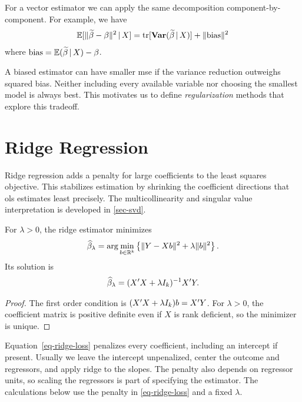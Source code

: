\documentclass[a4paper,12pt]{article}
\begin{document}
\begin{remark}
	For a vector estimator we can apply the same decomposition component-by-component.
	For example, we have
	\begin{align*}
		\operatorname{\mathbb{E}}[\|\widetilde\beta-\beta\|^2\mathpunct{}|\mathpunct{} X]
		=\operatorname{tr}[\operatorname{\text{\textrm{\upshape\textbf{Var}}}}(\widetilde\beta\mathpunct{}|\mathpunct{} X)]+\|\text{bias}\|^2
	\end{align*}
	where $\text{bias}=\operatorname{\mathbb{E}}(\widetilde\beta\mathpunct{}|\mathpunct{} X)-\beta$.
\end{remark}

\begin{remark}
	A biased estimator can have smaller \gls{mse} if the variance reduction outweighs squared bias.
	Neither including every available variable nor choosing the smallest model is always best.
	This motivates us to define \emph{regularization} methods that explore this tradeoff.
\end{remark}

\section{Ridge Regression}

Ridge regression adds a penalty for large coefficients to the least squares objective.
This stabilizes estimation by shrinking the coefficient directions that \gls{ols} estimates least precisely.
The multicollinearity and singular value interpretation is developed in \autoref{sec-svd}.

\begin{definition}
	For $\lambda>0$, the ridge estimator minimizes
	\begin{align}\label{eq-ridge-loss}
		\widehat\beta_\lambda
		=\arg\min_{b\in\mathbb{R}^k}
		\left\{\|Y-Xb\|^2+\lambda\|b\|^2\right\}.
	\end{align}
	Its solution is
	\begin{align}\label{eq-ridge-solution}
		\widehat\beta_\lambda=(X^{\prime} X+\lambda I_k)^{-1} X^{\prime} Y.
	\end{align}
\end{definition}
\begin{proof}
	The first order condition is $(X^{\prime} X+\lambda I_k)b=X^{\prime} Y$.
	For $\lambda>0$, the coefficient matrix is positive definite even if $X$ is rank deficient,
	so the minimizer is unique.
\end{proof}

\begin{remark}
	Equation~\eqref{eq-ridge-loss} penalizes every coefficient, including an intercept if present.
	Usually we leave the intercept unpenalized, center the outcome and regressors, and apply ridge to the slopes.
	The penalty also depends on regressor units, so scaling the regressors is part of specifying the estimator.
	The calculations below use the penalty in \eqref{eq-ridge-loss} and a fixed $\lambda$.
\end{remark}
\end{document}
